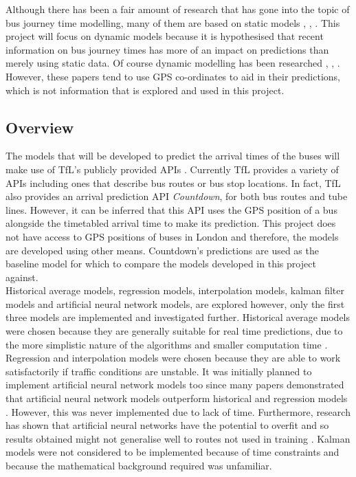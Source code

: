 Although there has been a fair amount of research that has gone into the topic of bus journey time modelling, many of them are based on static models \cite{ann-prediction}, \cite{weather-transport-effect}, \cite{google-machine-learning}. This project will focus on dynamic models because it is hypothesised that recent information on bus journey times has more of an impact on predictions than merely using static data. Of course dynamic modelling has been researched \cite{traffic-modelling-article}, \cite{dynamic-gps}, \cite{smart-public-transport}. However, these papers tend to use GPS co-ordinates to aid in their predictions, which is not information that is explored and used in this project.

\subsection{Overview}
\label{section:introduction-overview}

The models that will be developed to predict the arrival times of the buses will make use of TfL's publicly provided APIs \cite{tfl-api}. Currently TfL provides a variety of APIs including ones that describe bus routes or bus stop locations. In fact, TfL also provides an arrival prediction API \textit{Countdown}, for both bus routes and tube lines. However, it can be inferred that this API uses the GPS position of a bus alongside the timetabled arrival time to make its prediction. This project does not have access to GPS positions of buses in London and therefore, the models are developed using other means. Countdown's predictions are used as the baseline model for which to compare the models developed in this project against. \\

Historical average models, regression models, interpolation models, kalman filter models and artificial neural network models, are explored however, only the first three models are implemented and investigated further. Historical average models were chosen because they are generally suitable for real time predictions, due to the more simplistic nature of the algorithms and smaller computation time \cite{dynamic-gps}. Regression and interpolation models were chosen because they are able to work satisfactorily if traffic conditions are unstable. It was initially planned to implement artificial neural network models too since many papers demonstrated that artificial neural network models outperform historical and regression models \cite{ann-prediction}. However, this was never implemented due to lack of time. Furthermore, research has shown that artificial neural networks have the potential to overfit and so results obtained might not generalise well to routes not used in training \cite{dynamic-gps}. Kalman models were not considered to be implemented because of time constraints and because the mathematical background required was unfamiliar. \\

